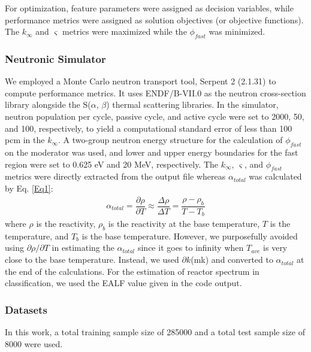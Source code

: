     For optimization, feature parameters were assigned as decision variables, while performance metrics were assigned as solution objectives (or objective functions). The $k_{\infty}$ and $\varsigma$ metrics were maximized while the $\phi_{fast}$ was minimized.

\subsubsection{Neutronic Simulator}

    We employed a Monte Carlo neutron transport tool, Serpent 2 (2.1.31) \cite{Lep2014} to compute performance metrics. It uses ENDF/B-VII.0 \cite{chadwick2006} as the neutron cross-section library alongside the S(${\alpha}$, ${\beta}$) thermal scattering libraries. In the simulator, neutron population per cycle, passive cycle, and active cycle were set to 2000, 50, and 100, respectively, to yield a computational standard error of less than 100 pcm in the $k_{\infty}$. A two-group neutron energy structure for the calculation of $\phi_{fast}$ on the moderator was used, and lower and upper energy boundaries for the fast region were set to 0.625 eV and 20 MeV, respectively. The $k_{\infty}$, $\varsigma$, and $\phi_{fast}$ metrics were directly extracted from the output file whereas ${\alpha_{total}}$ was calculated by Eq. \protect\ref{Eq1}:
    \begin{eqnarray}\label{Eq1}
    \alpha_{total} = \dfrac{\partial\rho}{\partial T} \approx
    \dfrac{\Delta\rho}{\Delta T}=\dfrac{\rho-\rho_b}{T-T_b}
    \end{eqnarray}
    where $\rho$ is the reactivity, $\rho_b$ is the reactivity at the base temperature, $T$ is the temperature, and $T_b$ is the base temperature. However, we purposefully avoided using $\partial \rho /\partial T$ in estimating the ${\alpha_{total}}$ since it goes to infinity when $T_{ave}$ is very close to the base temperature. Instead, we used $\partial k$(mk) and converted to ${\alpha_{total}}$ at the end of the calculations. For the estimation of reactor spectrum in classification, we used the \gls{EALF}  value given in the code output.

\subsubsection{Datasets}
    In this work, a total training sample size of 285000 and a total test sample
    size of 8000 were used.


